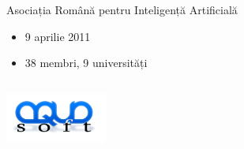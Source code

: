 \documentclass{beamer}
\begin{document}
\begin{frame}[t]
	\begin{center}
		\LARGE{Asociația Română pentru Inteligență Artificială}
	\end{center}%
	\begin{itemize}
		\item 9 aprilie 2011
		\item 38 membri, 9 universități
	\end{itemize}

	
	\begin{center}
	\begin{columns}[h]


	\end{columns}
	\end{center}%
	
	\begin{center}
		\includegraphics[width=0.25\textwidth]{graphics/intro/aquasoft-logo}%
	\end{center}%


\end{frame}
\end{document}
